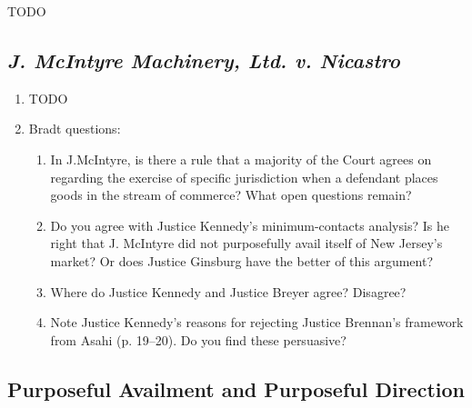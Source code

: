 TODO

\subsection{\emph{J. McIntyre Machinery, Ltd. v. Nicastro}}

\begin{enumerate}
    \item TODO
    \item Bradt questions:
    \begin{enumerate}
        \item In J.McIntyre, is there a rule that a majority of the Court agrees on regarding the exercise of specific jurisdiction when a defendant places goods in the stream of commerce? What open questions remain?
        \item Do you agree with Justice Kennedy's minimum-contacts analysis? Is he right that J. McIntyre did not purposefully avail itself of New Jersey's market? Or does Justice Ginsburg have the better of this argument?
        \item Where do Justice Kennedy and Justice Breyer agree? Disagree?
        \item Note Justice Kennedy's reasons for rejecting Justice Brennan's framework from Asahi (p. 19--20). Do you find these persuasive?
    \end{enumerate}
\end{enumerate}

\subsection{Purposeful Availment and Purposeful Direction}

